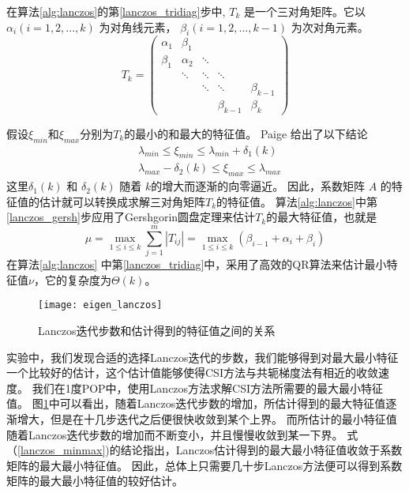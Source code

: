 在算法\ref{alg:lanczos}的第\ref{lanczos_tridiag}步中, $T_k$ 是一个三对角矩阵。它以 $\alpha_i (i=1,2,...,k)$ 为对角线元素， $\beta_i (i=1,2,...,k-1)$ 为次对角元素。 
\[ T_{k} = \left(\begin{array}{ccccc}
\alpha_1 & \beta_1  &  &&  \\
\beta_1 & \alpha_2  & \ddots &&  \\
  & \ddots & \ddots & \ddots&  \\
  &    &\ddots  &\ddots& \beta_{k-1} \\
 &    &  &\beta_{k-1}& \beta_{k} 
\end{array} \right)\]

假设$\xi_{min}$和$\xi_{max}$分别为$T_k$的最小的和最大的特征值。
Paige\cite{Paige1980235} 给出了以下结论
\begin{equation}\label{lanczos_minmax}
\begin{aligned} 
&\lambda_{min} \le \xi_{min} \le \lambda_{min}+\delta_1(k) \\
&\lambda_{max}-\delta_2(k)  \le \xi_{max} \le \lambda_{max}
\end{aligned}
\end{equation}
这里$\delta_1(k)$ 和 $\delta_2(k)$ 随着 $k$的增大而逐渐的向零逼近。 因此，系数矩阵 $A$ 的特征值的估计就可以转换成求解三对角矩阵$T_k$的特征值。 
算法\ref{alg:lanczos}中第\ref{lanczos_gersh}步应用了Gershgorin圆盘定理来估计$T_k$的最大特征值，也就是 
\begin{equation}
\mu = \max_{1 \le i \le k}\sum^m_{j=1}|T_{ij}|=\max_{1 \le i \le k}(\beta_{i-1}+\alpha_i +\beta_{i})
\end{equation}
在算法\ref{alg:lanczos} 中第\ref{lanczos_tridiag}中，采用了高效的QR算法\cite{ortega1963llt}来估计最小特征值$\nu$，它的复杂度为$\Theta(k)$。
 
\begin {figure}%
\centering
\texttt{[image: eigen\_lanczos]}
\caption[] {Lanczos迭代步数和估计得到的特征值之间的关系\label{fig:lanczos_eigs}}
\end{figure}
实验中，我们发现合适的选择Lanczos迭代的步数，我们能够得到对最大最小特征一个比较好的估计，这个估计值能够使得CSI方法与共轭梯度法有相近的收敛速度。  
我们在1度POP中，使用Lanczos方法求解CSI方法所需要的最大最小特征值。 
图\ref{fig:lanczos_eigs}中可以看出，随着Lanczos迭代步数的增加，所估计得到的最大特征值逐渐增大，但是在十几步迭代之后便很快收敛到某个上界。
而所估计的最小特征值随着Lanczos迭代步数的增加而不断变小，并且慢慢收敛到某一下界。 
式（\ref{lanczos_minmax})的结论指出，Lanczos估计得到的最大最小特征值收敛于系数矩阵的最大最小特征值。
因此，总体上只需要几十步Lanczos方法便可以得到系数矩阵的最大最小特征值的较好估计。

